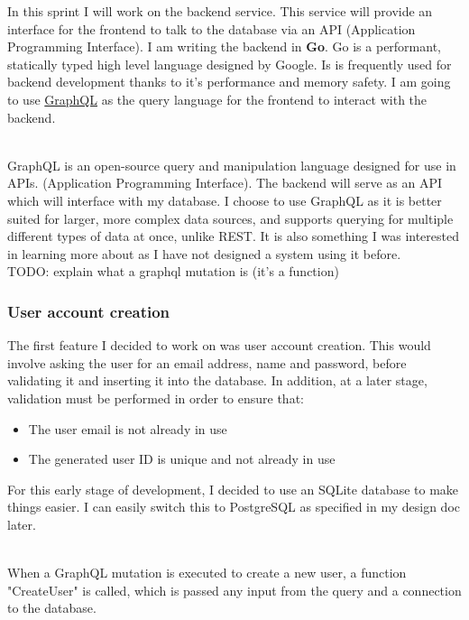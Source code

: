 \documentclass{article}
\begin{document}
In this sprint I will work on the backend service. This service will provide an interface for the frontend to talk to the database via an API (Application Programming Interface). I am writing the backend in \textbf{Go}.
Go is a performant, statically typed high level language designed by Google.
Is is frequently used for backend development thanks to it's performance and memory safety.
I am going to use \underline{GraphQL} as the query language for the frontend to interact with the backend.

\noindent \\ GraphQL is an open-source query and manipulation language designed for use in APIs. (Application Programming Interface). The backend will serve as an API which will interface with my database.
I choose to use GraphQL as it is better suited for larger, more complex data sources, and supports querying for multiple different types of data at once, unlike REST. It is also something I was interested in learning more about as I have not designed a system using it before. \\


TODO: explain what a graphql mutation is (it's a function)

\subsubsection{User account creation}

The first feature I decided to work on was user account creation. This would involve asking the user for an email address, name and password, before validating it and inserting it into the database.
In addition, at a later stage, validation must be performed in order to ensure that:

\begin{itemize}
    \item The user email is not already in use
    \item The generated user ID is unique and not already in use
\end{itemize}

\noindent For this early stage of development, I decided to use an SQLite database to make things easier. I can easily switch this to PostgreSQL as specified in my design doc later.

\noindent \\ When a GraphQL mutation is executed to create a new user, a function "CreateUser" is called, which is passed any input from the query and a connection to the database. \\
\end{document}
